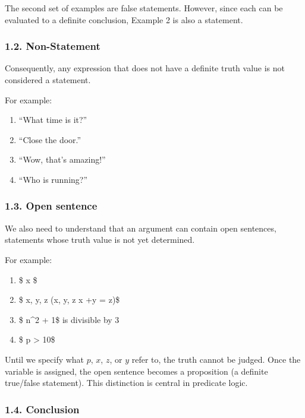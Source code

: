 The second set of examples are false statements. However, since each can
be evaluated to a definite conclusion, Example 2 is also a statement.

\subsubsection{1.2. Non-Statement}\label{non-statement}

Consequently, any expression that does not have a definite truth value
is not considered a statement.

For example:

\begin{enumerate}
\def\labelenumi{\arabic{enumi}.}
\item
  ``What time is it?''
\item
  ``Close the door.''
\item
  ``Wow, that's amazing!''
\item
  ``Who is running?''
\end{enumerate}

\subsubsection{1.3. Open sentence}\label{open-sentence}

We also need to understand that an argument can contain open sentences,
statements whose truth value is not yet determined.

For example:

\begin{enumerate}
\def\labelenumi{\arabic{enumi}.}
\item
  \$ x \$
\item
  \$ \forall x, y, z (x, y, z \in {} \mid x +y = z)\$
\item
  \$ n\^{}2 + 1\$ is divisible by \(3\)
\item
  \$ p \textgreater{} 10\$
\end{enumerate}

Until we specify what \(p\), \(x\), \(z\), or \(y\) refer to, the truth
cannot be judged. Once the variable is assigned, the open sentence
becomes a proposition (a definite true/false statement). This
distinction is central in predicate logic.

\subsubsection{1.4. Conclusion}\label{conclusion}

